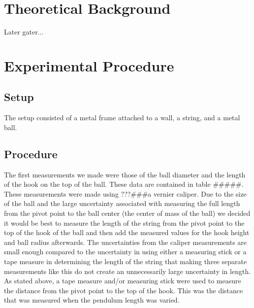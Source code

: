 \documentclass[iop]{emulateapj}
\begin{document}
\section{Theoretical Background}
\label{sec:theory}


Later gater...








\section{Experimental Procedure}
\label{sec:procedure}

\subsection{Setup}

The setup consisted of a metal frame attached to a wall, a string, and a metal 
ball.

\subsection{Procedure}

The first measurements we made were those of the ball diameter and the length 
of the hook on the top of the ball.  These data are contained in table \#\#\#\#\#. 
These measurements were made using ???\#\#\#a vernier caliper.  Due to the size of 
the ball and the large uncertainty associated with measuring the full length 
from the pivot point to the ball center (the center of mass of the
ball) we decided it would be best to measure the length of the string from the
pivot point to the top of the hook of the ball and then add the measured values 
for the hook height and ball radius afterwards.  The uncertainties from the 
caliper measurements are small enough compared to the uncertainty in using 
either a measuring stick or a tape measure in determining the length of the
string that making three separate measurements like this do not create an 
unnecessarily large uncertainty in length.  As stated above, a tape measure 
and/or measuring stick were used to measure the distance from the pivot point
to the top of the hook.  This was the distance that was measured when the
pendulum length was varied.
\end{document}
